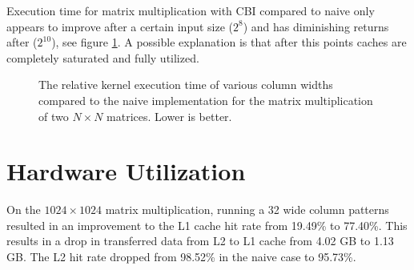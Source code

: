 Execution time for matrix multiplication with CBI compared to naive only appears to improve after a certain input size ($2^8$) and has diminishing returns after ($2^10$), see figure \ref{fig:mm_naive_vs_cbi}.
A possible explanation is that after this points caches are completely saturated and fully utilized.

\begin{figure}[H]
    \centering
    \caption{
        The relative kernel execution time of various column widths compared to the naive implementation for the matrix multiplication of two $N \times N$ matrices. Lower is better.
    }
    \label{fig:mm_naive_vs_cbi}
\end{figure}

\section{Hardware Utilization}
On the $1024 \times 1024$ matrix multiplication, running a 32 wide column patterns resulted in an improvement to the L1 cache hit rate from 19.49\% to 77.40\%.
This results in a drop in transferred data from L2 to L1 cache from 4.02 GB to 1.13 GB. 
The L2 hit rate dropped from 98.52\% in the naive case to 95.73\%.

